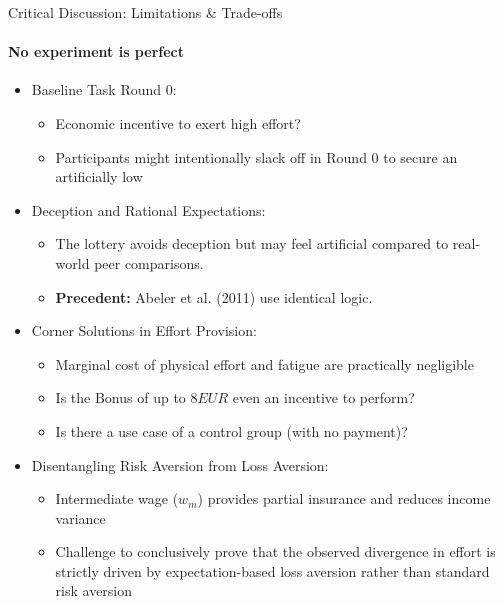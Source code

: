 \documentclass{beamer}
\begin{document}
\begin{frame}{Critical Discussion: Limitations \& Trade-offs}
\framesubtitle{No experiment is perfect}

\footnotesize

    \begin{itemize}
        \item Baseline Task Round 0:
        \begin{itemize}
            \item Economic incentive to exert high effort?
            \item Participants might intentionally slack off in Round 0 to secure an artificially low
        \end{itemize}

        \item Deception and Rational Expectations:
        \begin{itemize}
            \item The lottery avoids deception but may feel artificial compared to real-world peer comparisons.
            \item \textbf{Precedent:} Abeler et al. (2011) use identical logic.
        \end{itemize}

        \item Corner Solutions in Effort Provision:
        \begin{itemize}
            \item Marginal cost of physical effort and fatigue are practically negligible
            \item Is the Bonus of up to $8EUR$ even an incentive to perform?
            \item Is there a use case of a control group (with no payment)?
        \end{itemize}

        \item Disentangling Risk Aversion from Loss Aversion:
        \begin{itemize}
            \item Intermediate wage ($w_m$) provides partial insurance and reduces income variance
            \item Challenge to conclusively prove that the observed divergence in effort is strictly driven by expectation-based loss aversion rather than standard risk aversion
        \end{itemize}
    \end{itemize}



\end{frame}
\end{document}
